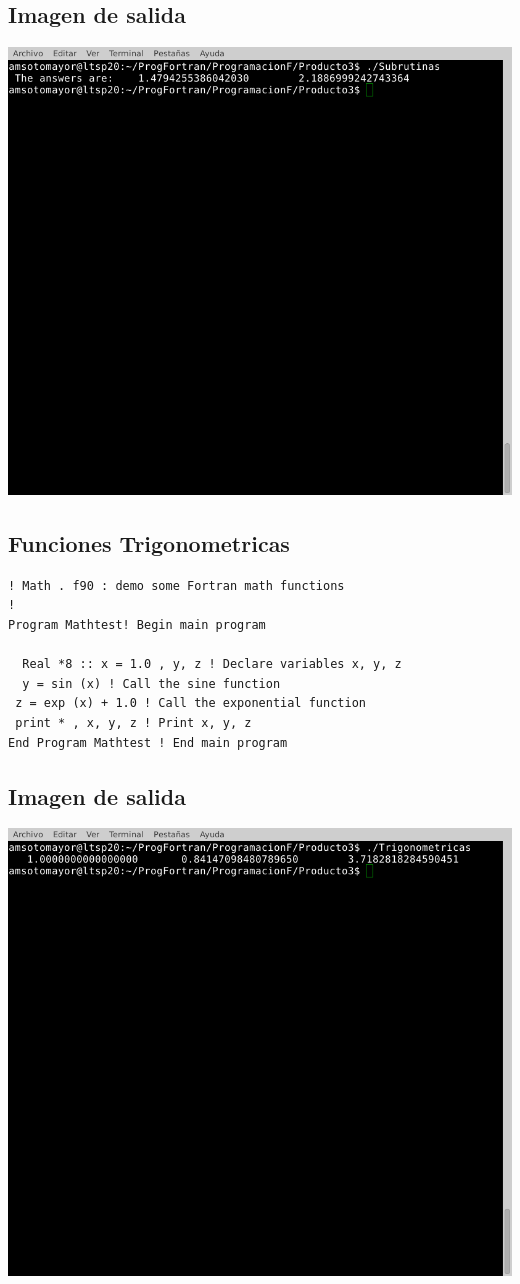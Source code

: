 \documentclass[letterpaper,10pt,twoside,onecolumn]{article}
\begin{document}
\subsection{Imagen de salida}
\includegraphics[scale=.75]{Subrutinas.png}

\subsection{Funciones Trigonometricas}
\begin{verbatim}
! Math . f90 : demo some Fortran math functions
! 
Program Mathtest! Begin main program

  Real *8 :: x = 1.0 , y, z ! Declare variables x, y, z
  y = sin (x) ! Call the sine function
 z = exp (x) + 1.0 ! Call the exponential function
 print * , x, y, z ! Print x, y, z
End Program Mathtest ! End main program 
\end{verbatim}
\subsection{Imagen de salida}
\includegraphics[scale=.75]{Trigonometricas.png}
\end{document}
